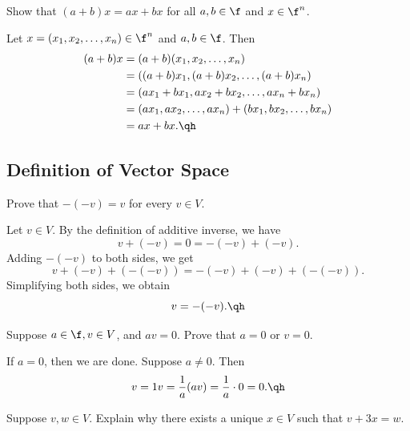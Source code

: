 \begin{exercise}[1a15]
    Show that $(a + b)x = ax + bx$ for all $a, b \in \f$ and $x \in \f^n$.
\end{exercise}

\begin{sol}
    Let $x = (x_1, x_2, \ldots, x_n) \in \f^n$ and $a, b \in \f$. Then
    \begin{align*}
        (a + b)x & = (a + b)(x_1, x_2, \ldots, x_n) \\
        & = ((a + b)x_1, (a + b)x_2, \ldots, (a + b)x_n) \\
        & = (ax_1 + bx_1, ax_2 + bx_2, \ldots, ax_n + bx_n) \\
        & = (ax_1, ax_2, \ldots, ax_n) + (bx_1, bx_2, \ldots, bx_n) \\
        & = ax + bx. \qh
    \end{align*}
\end{sol}

\newpage

\subsection{Definition of Vector Space}

\begin{exercise}[1b1]
    Prove that $-(-v) = v$ for every $v \in V$.
\end{exercise}

\begin{sol}
    Let $v \in V$. By the definition of additive inverse, we have
    \[v + (-v) = 0 = -(-v) + (-v).\]
    Adding $-(-v)$ to both sides, we get
    \[v + (-v) + (-(-v)) = -(-v) + (-v) + (-(-v)).\]
    Simplifying both sides, we obtain
    \[v = -(-v). \qh\]
\end{sol}

\begin{exercise}[1b2]
    Suppose $a \in \f, v \in V$, and $av = 0$. Prove that $a = 0$ or $v = 0$.
\end{exercise}

\begin{sol}
    If $a = 0$, then we are done. Suppose $a \neq 0$. Then
    \[v = 1v = \frac1a(av) = \frac1a \cdot 0 = 0. \qh\]
\end{sol}

\begin{exercise}[1b3]
    Suppose $v, w \in V$. Explain why there exists a unique $x \in V$ such that $v + 3x = w$.
\end{exercise}

